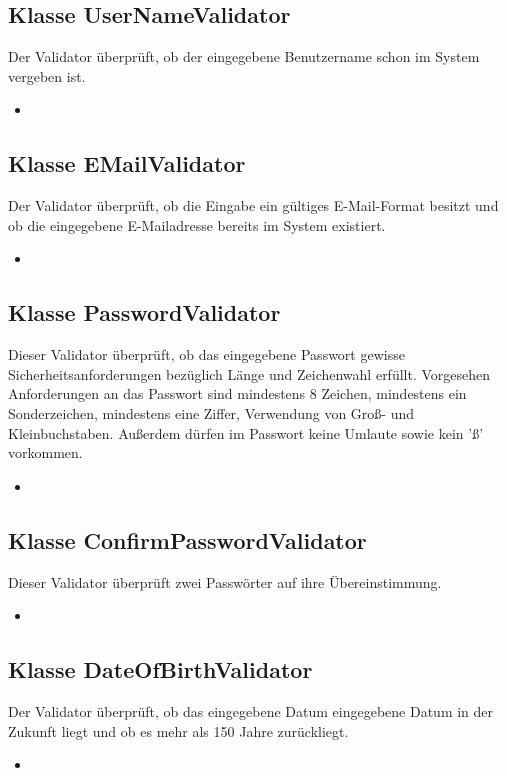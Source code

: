 	\subsection{Klasse UserNameValidator}
	Der Validator überprüft, ob der eingegebene Benutzername schon im System vergeben ist.
	\begin{itemize}
		\item \override
	\end{itemize}
	
	\subsection{Klasse EMailValidator}
	Der Validator überprüft, ob die Eingabe ein gültiges E-Mail-Format besitzt und ob die eingegebene E-Mailadresse bereits im System existiert.
	\begin{itemize}
		\item \override
	\end{itemize}
	
	\subsection{Klasse PasswordValidator}
	Dieser Validator überprüft, ob das eingegebene Passwort gewisse Sicherheitsanforderungen bezüglich Länge und Zeichenwahl erfüllt. Vorgesehen Anforderungen an das Passwort sind mindestens 8 Zeichen, mindestens ein Sonderzeichen, mindestens eine Ziffer, Verwendung von Groß- und Kleinbuchstaben. Außerdem dürfen im Passwort keine Umlaute sowie kein 'ß' vorkommen.
	\begin{itemize}
		\item \override
	\end{itemize}
	
	\subsection{Klasse ConfirmPasswordValidator}
	Dieser Validator überprüft zwei Passwörter auf ihre Übereinstimmung.
	\begin{itemize}
		\item \override
	\end{itemize}
	
	\subsection{Klasse DateOfBirthValidator}
	Der Validator überprüft, ob das eingegebene Datum eingegebene Datum in der Zukunft liegt und ob es mehr als 150 Jahre zurückliegt.
	\begin{itemize}
		\item \override
	\end{itemize}
	
